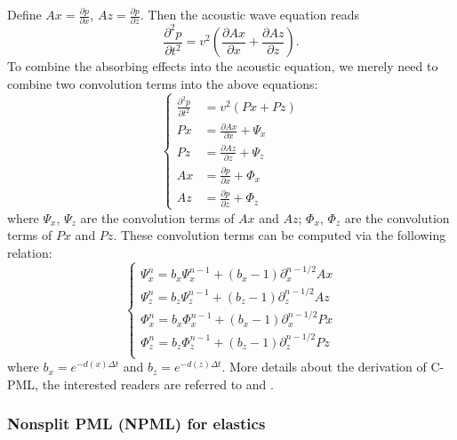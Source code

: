Define $Ax=\frac{\partial p}{\partial x}$, $Az=\frac{\partial p}{\partial z}$. Then the acoustic wave equation reads
\begin{displaymath}
\frac{\partial^2 p}{\partial t^2}=v^2\left(\frac{\partial Ax}{\partial x}+\frac{\partial Az}{\partial z}\right).
\end{displaymath}
To combine the absorbing effects into the acoustic equation, we merely need to combine two convolution terms into the above equations:
\begin{equation}
\left\{
\begin{split}
\frac{\partial^2 p}{\partial t^2}&=v^2\left(Px+Pz\right)\\
Px&=\frac{\partial Ax}{\partial x}+\Psi_x\\
Pz&=\frac{\partial Az}{\partial z}+\Psi_z\\
Ax&=\frac{\partial p}{\partial x}+\Phi_x\\
Az&=\frac{\partial p}{\partial z}+\Phi_z
\end{split}
\right.
\end{equation}
where $\Psi_x$, $\Psi_z$ are the convolution terms of $Ax$ and $Az$; $\Phi_x$, $\Phi_z$ are the convolution terms of $Px$ and $Pz$. These convolution terms can be computed via the following relation:
\begin{equation}
\left\{
\begin{split}
\Psi_x^n=b_x \Psi_x^{n-1}+(b_x-1) \partial_x^{n-1/2}Ax\\
\Psi_z^n=b_z \Psi_z^{n-1}+(b_z-1) \partial_z^{n-1/2}Az\\
\Phi_x^n=b_x \Phi_x^{n-1}+(b_x-1) \partial_x^{n-1/2}Px\\
\Phi_z^n=b_z \Phi_z^{n-1}+(b_z-1) \partial_z^{n-1/2}Pz\\
\end{split}
\right.
\end{equation}
where $b_x=e^{-d(x)\Delta t}$ and $b_z=e^{-d(z)\Delta t}$. More details about the derivation of C-PML, the interested readers are referred to \cite{collino2001application} and \cite{komatitsch2007unsplit}.

\subsubsection{Nonsplit PML (NPML) for elastics}

